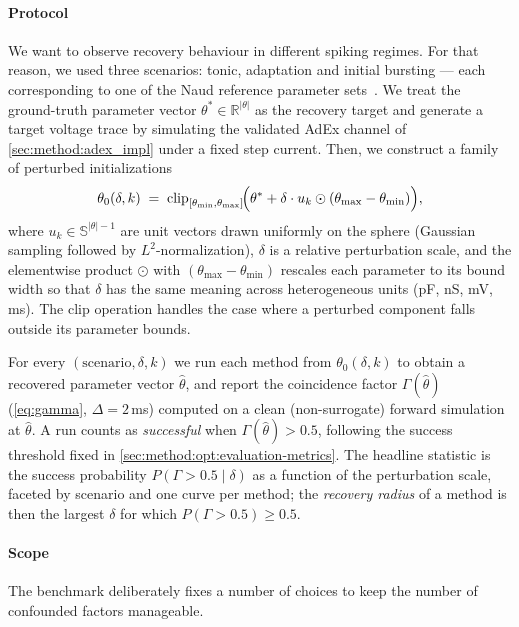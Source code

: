\paragraph{Protocol}\label{sec:method:opt:recovery-benchmark:protocol}
We want to observe recovery behaviour in different spiking regimes.
For that reason, we used three scenarios: tonic, adaptation and initial bursting --- each corresponding to one of the Naud reference parameter sets~\cite{Naud2008}.
We treat the ground-truth parameter vector $\theta^{*}\in\mathbb{R}^{|\theta|}$ as the recovery target and generate a target voltage trace by simulating the validated \gls{AdEx} channel of \cref{sec:method:adex_impl} under a fixed step current.
Then, we construct a family of perturbed initializations
\begin{equation}\label{eq:perturb}
    \theta_0(\delta, k) \;=\; \mathrm{clip}_{[\theta_{\min},\theta_{\max}]}\!\Bigl( \theta^{*} + \delta \cdot u_k \odot (\theta_{\max} - \theta_{\min}) \Bigr),
\end{equation}
where $u_k\in\mathbb{S}^{|\theta|-1}$ are unit vectors drawn uniformly on the sphere (Gaussian sampling followed by $L^{2}$-normalization), $\delta$ is a relative perturbation scale, and the elementwise product $\odot$ with $(\theta_{\max}-\theta_{\min})$ rescales each parameter to its bound width so that $\delta$ has the same meaning across heterogeneous units (pF, nS, mV, ms).
The clip operation handles the case where a perturbed component falls outside its parameter bounds.

For every $(\text{scenario}, \delta, k)$ we run each method from $\theta_0(\delta, k)$ to obtain a recovered parameter vector $\hat\theta$, and report the coincidence factor $\Gamma(\hat\theta)$ (\cref{eq:gamma}, $\Delta = 2$\,ms) computed on a clean (non-surrogate) forward simulation at $\hat\theta$.
A run counts as \emph{successful} when $\Gamma(\hat\theta) > 0.5$, following the success threshold fixed in \cref{sec:method:opt:evaluation-metrics}.
The headline statistic is the success probability $P(\Gamma > 0.5 \mid \delta)$ as a function of the perturbation scale, faceted by scenario and one curve per method;
the \emph{recovery radius} of a method is then the largest $\delta$ for which $P(\Gamma>0.5)\geq 0.5$.

\paragraph{Scope}\label{sec:method:opt:recovery-benchmark:scope}
The benchmark deliberately fixes a number of choices to keep the number of confounded factors manageable.

